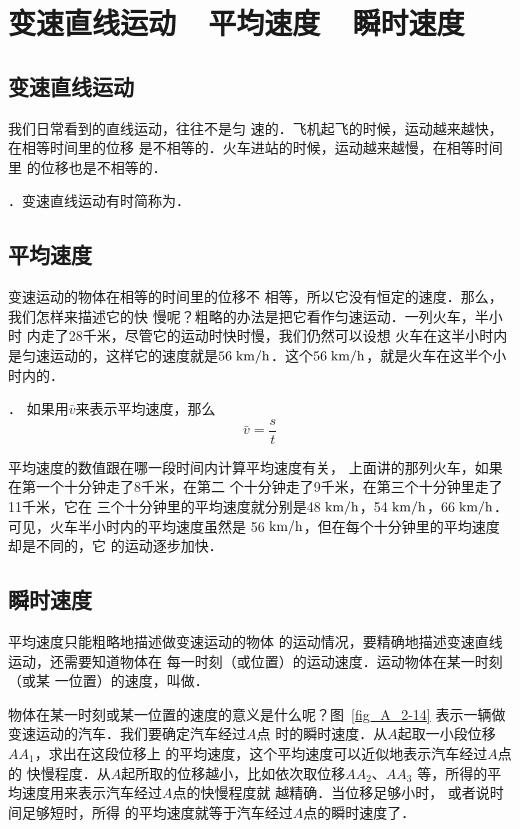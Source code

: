 \section{变速直线运动~~平均速度~~瞬时速度}
    \subsection{变速直线运动}
    
    我们日常看到的直线运动，往往不是匀
速的．飞机起飞的时候，运动越来越快，在相等时间里的位移
是不相等的．火车进站的时候，运动越来越慢，在相等时间里
的位移也是不相等的．

．变速直线运动有时简称为．

\subsection{平均速度}

变速运动的物体在相等的时间里的位移不
相等，所以它没有恒定的速度．那么，我们怎样来描述它的快
慢呢？粗略的办法是把它看作匀速运动．一列火车，半小时
内走了28千米，尽管它的运动时快时慢，我们仍然可以设想
火车在这半小时内是匀速运动的，这样它的速度就是$56 \;\text{km}/\text{h}$．这个$56 \;\text{km}/\text{h}$，就是火车在这半个小时内的．

．
如果用$\bar v$来表示平均速度，那么
\[\bar v=\frac{s}{t}\]

平均速度的数值跟在哪一段时间内计算平均速度有关，
上面讲的那列火车，如果在第一个十分钟走了8千米，在第二
个十分钟走了9千米，在第三个十分钟里走了11千米，它在
三个十分钟里的平均速度就分别是48$\;\text{km}/\text{h}$，54$\;\text{km}/\text{h}$，66$\;\text{km}/\text{h}$．可见，火车半小时内的平均速度虽然是
56$\;\text{km}/\text{h}$，但在每个十分钟里的平均速度却是不同的，它
的运动逐步加快．

\subsection{瞬时速度}
平均速度只能粗略地描述做变速运动的物体
的运动情况，要精确地描述变速直线运动，还需要知道物体在
每一时刻（或位置）的运动速度．运动物体在某一时刻（或某
一位置）的速度，叫做．

物体在某一时刻或某一位置的速度的意义是什么呢？图~\ref{fig_A_2-14} 
表示一辆做变速运动的汽车．我们要确定汽车经过$A$点
时的瞬时速度．从$A$起取一小段位移$AA_1$，求出在这段位移上
的平均速度，这个平均速度可以近似地表示汽车经过$A$点的
快慢程度．从$A$起所取的位移越小，比如依次取位移$AA_2$、$AA_3$
等，所得的平均速度用来表示汽车经过$A$点的快慢程度就
越精确．当位移足够小时，
或者说时间足够短时，所得
的平均速度就等于汽车经过$A$点的瞬时速度了．

